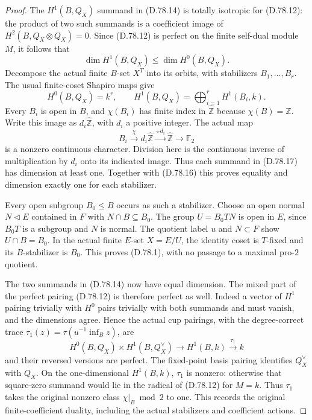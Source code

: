 \begin{proof}
The $H^1(B,Q_X)$ summand in (D.78.14) is totally isotropic for (D.78.12):
the product of two such summands is a coefficient image of
$H^2(B,Q_X\otimes Q_X)=0$. Since (D.78.12) is perfect on the finite
self-dual module $M$, it follows that
\[
                 \dim H^1(B,Q_X)\leq\dim H^0(B,Q_X).         \tag{D.78.16}
\]
Decompose the actual finite $B$-set $X^T$ into its orbits, with
stabilizers $B_1,\ldots,B_r$. The usual finite-coset Shapiro maps give
\[
 H^0(B,Q_X)=k^r,\qquad
 H^1(B,Q_X)=\bigoplus_{i=1}^rH^1(B_i,k).                       \tag{D.78.17}
\]
Every $B_i$ is open in $B$, and $\chi(B_i)$ has finite index in
$\widehat{\mathbb Z}$ because $\chi(B)=\widehat{\mathbb Z}$.
Write this image as $d_i\widehat{\mathbb Z}$, with $d_i$ a positive
integer. The actual map
\[
       B_i\xrightarrow{\chi}d_i\widehat{\mathbb Z}
        \xrightarrow{\div d_i}\widehat{\mathbb Z}
          \longrightarrow\mathbb F_2                        \tag{D.78.18}
\]
is a nonzero continuous character. Division here is the continuous
inverse of multiplication by $d_i$ onto its indicated image.
Thus each summand in (D.78.17) has dimension at least one. Together with
(D.78.16) this proves equality and dimension exactly one for each stabilizer.

Every open subgroup $B_0\leq B$ occurs as such a stabilizer. Choose an
open normal $N\triangleleft E$ contained in $F$ with
$N\cap B\subseteq B_0$. The group $U=B_0TN$ is open in $E$, since
$B_0T$ is a subgroup and $N$ is normal. The quotient label $u$ and
$N\subset F$ show $U\cap B=B_0$. In the actual finite $E$-set
$X=E/U$, the identity coset is $T$-fixed and its $B$-stabilizer is $B_0$.
This proves (D.78.1), with no passage to a maximal pro-$2$ quotient.

The two summands in (D.78.14) now have equal dimension. The mixed part
of the perfect pairing (D.78.12) is therefore perfect as well. Indeed
a vector of $H^1$ pairing trivially with $H^0$ pairs trivially with
both summands and must vanish, and the dimensions agree. Hence the
actual cup pairings, with the degree-correct trace
$\tau_1(z)=\tau(u^{-1}\operatorname{inf}_Bz)$, are
\[
 H^0(B,Q_X)\times H^1(B,Q_X^\vee)
     \longrightarrow H^1(B,k)\xrightarrow{\tau_1}k            \tag{D.78.19}
\]
and their reversed versions are perfect. The fixed-point basis pairing
identifies $Q_X^\vee$ with $Q_X$. On the one-dimensional $H^1(B,k)$,
$\tau_1$ is nonzero: otherwise that square-zero summand would lie in the
radical of (D.78.12) for $M=k$. Thus $\tau_1$ takes the original nonzero class
$\chi|_B\bmod2$ to one. This records the original finite-coefficient duality, including the
actual stabilizers and coefficient actions.


\end{proof}
